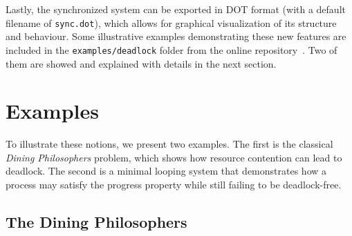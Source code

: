 


Lastly, the synchronized system can be exported in DOT format
(with a default filename of \verb|sync.dot|), which allows for graphical 
visualization of its structure and behaviour. Some illustrative examples 
demonstrating these new features are included in the
\verb|examples/deadlock| folder from the online repository~\cite{rescurepo}.
Two of them are showed and explained with details in the next section.


\section{Examples}

To illustrate these notions, we present two examples. The first is the
classical \emph{Dining Philosophers} problem, which shows how resource
contention can lead to deadlock. The second is a minimal looping system
that demonstrates how a process may satisfy the progress property while
still failing to be deadlock-free.

\subsection{The Dining Philosophers}

